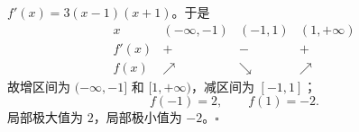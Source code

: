 $f'(x)=3(x-1)(x+1)$。于是
\[
 \begin{array}{c|ccc}
 x&(-\infty,-1)&(-1,1)&(1,+\infty)\\ \hline
 f'(x)&+&-&+\\
 f(x)&\nearrow&\searrow&\nearrow
 \end{array}
\]
故增区间为 $(-\infty,-1]$ 和 $[1,+\infty)$，减区间为 $[-1,1]$；
\[
 f(-1)=2,\qquad f(1)=-2.
\]
局部极大值为 $2$，局部极小值为 $-2$。$\square$
